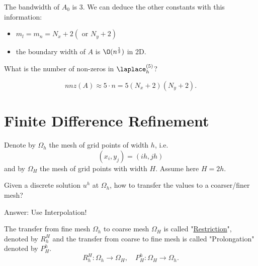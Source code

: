 The bandwidth of $A_0$ is 3.
We can deduce the other constants with this information:
\begin{itemize}
	\item $m_{l}=m_{n}=N_{x}+2 (\text{ or } N_{y}+2)$
	\item the boundary width of $A$ is $\O(n^{\frac{1}{2}})$ in 2D.
\end{itemize}

What is the number of non-zeros in $\laplace_{h}^{(5)} $?

\[
	nnz(A) \approx 5 \cdot n = 5(N_{x} +2)(N_{y} +2)
.\] 

\section{Finite Difference Refinement}%
\label{sec:Finite Difference Refinement}

Denote by $\Omega_{h}$ the mesh of grid points of width $h$, i.e. 
\[
	(x_{i}, y_{j}) = (ih, jh)
\] 
and by $\Omega_{H}$ the mesh of grid points with width $H$. Assume here $H=2h$.

Given a discrete solution $u^{h}$ at $\Omega_{h}$, how to transfer the values to a coarser/finer mesh?

Answer: Use Interpolation!

The transfer from fine mesh $\Omega_{h}$ to coarse mesh $\Omega_{H}$ is called "\underline{Restriction}", denoted by $R_{h}^{H}$ and the transfer from coarse to fine mesh is called "Prolongation" denoted by $P_{H}^{h}$.
\[
R_{h}^{H}: \Omega_{h} \rightarrow \Omega_{H}, \quad
P_{H}^{h}: \Omega_{H} \rightarrow \Omega_{h}
.\] 

